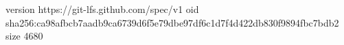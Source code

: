version https://git-lfs.github.com/spec/v1
oid sha256:ca98afbcb7aadb9ca6739d6f5e79dbe97df6c1d7f4d422db830f9894fbc7bdb2
size 4680
